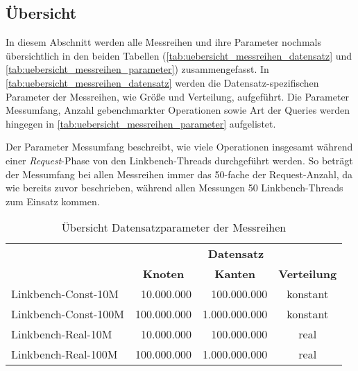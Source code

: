 \subsection{Übersicht}
In diesem Abschnitt werden alle Messreihen und ihre Parameter nochmals übersichtlich in den beiden Tabellen (\autoref{tab:uebersicht_messreihen_datensatz} und \autoref{tab:uebersicht_messreihen_parameter}) zusammengefasst. In \autoref{tab:uebersicht_messreihen_datensatz} werden die Datensatz-spezifischen Parameter der Messreihen, wie Größe und Verteilung, aufgeführt. Die Parameter Messumfang, Anzahl gebenchmarkter Operationen sowie Art der Queries werden hingegen in \autoref{tab:uebersicht_messreihen_parameter} aufgelistet.

Der Parameter Messumfang beschreibt, wie viele Operationen insgesamt während einer \textit{Request}-Phase von den Linkbench-Threads durchgeführt werden. So beträgt der Messumfang bei allen Messreihen immer das 50-fache der Request-Anzahl, da wie bereits zuvor beschrieben, während allen Messungen 50 Linkbench-Threads zum Einsatz kommen. 

\begin{table}[!ht]
    \centering
    \begin{tabular}{l|r|r|c}
    \hline
    \rowcolor[HTML]{EFEFEF} 
    \multicolumn{1}{c|}{\cellcolor[HTML]{EFEFEF}{\color[HTML]{333333} }} & \multicolumn{3}{c}{\cellcolor[HTML]{EFEFEF}\textbf{Datensatz}} \\ \cline{2-4} 
    \rowcolor[HTML]{EFEFEF} 
    \multicolumn{1}{c|}{\multirow{-2}{*}{\cellcolor[HTML]{EFEFEF}{\color[HTML]{333333} \textbf{Messreihe}}}} & \multicolumn{1}{c|}{\cellcolor[HTML]{EFEFEF}\textbf{Knoten}} & \multicolumn{1}{c|}{\cellcolor[HTML]{EFEFEF}\textbf{Kanten}} & \multicolumn{1}{l}{\cellcolor[HTML]{EFEFEF}\textbf{Verteilung}} \\ \hline
    Linkbench-Const-10M & 10.000.000 & 100.000.000 & konstant \\
    Linkbench-Const-100M & 100.000.000 & 1.000.000.000 & konstant \\
    Linkbench-Real-10M & 10.000.000 & 100.000.000 & real \\
    Linkbench-Real-100M & 100.000.000 & 1.000.000.000 & real \\ \hline
    \end{tabular}
    \caption{Übersicht Datensatzparameter der Messreihen}
    \label{tab:uebersicht_messreihen_datensatz}
\end{table}

